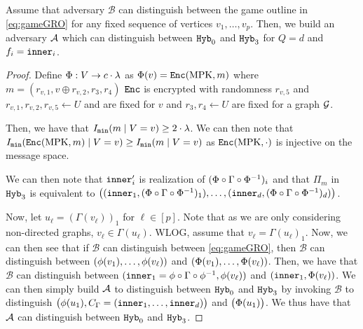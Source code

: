 \newcommand{\adversB}{\mathcal{B}}
\begin{lemma}
	Assume that adversary $\adversB$ can distinguish between the game outline in \cref{eq:gameGRO} for any fixed sequence of vertices $v_1, \dots, v_p$.
	Then, we build an adversary
	$\mathcal{A}$ which can distinguish between $\texttt{Hyb}_0$ and $\texttt{Hyb}_3$ for $Q = d$ and $f_i = \texttt{inner}_i$.
	\begin{proof}
		Define $\Phi : V \rightarrow c \cdot \lambda$ as $\Phi(v) = \texttt{Enc}(\text{MPK}, m)$ 
		where $m = (r_{v, 1}, v \oplus r_{v, 2}, r_3, r_4)$
		$\texttt{Enc}$ is encrypted with randomness $r_{v, 5}$ and $r_{v, 1}, r_{v, 2}, r_{v, 5} \leftarrow U$ and are fixed for $v$
		and $r_3, r_4 \leftarrow U$ are fixed for a graph $\mathcal{G}$.

		Then, we have that $I_\texttt{min}(m \mid V = v) \geq 2 \cdot \lambda$. We can then note that $I_\texttt{min}(\texttt{Enc}(\text{MPK}, m) \mid V = v) \geq I_\texttt{min}(m \mid V = v)$
		as $\texttt{Enc}(\text{MPK}, \cdot)$ is injective on the message space.
		
		We can then note that $\texttt{inner}_i'$ is realization
		of $(\Phi \circ \Gamma \circ \Phi^{-1})_i$ and that $\Pi_m$ in $\texttt{Hyb}_3$ 
		is equivalent to $\big((\texttt{inner}_1, (\Phi \circ \Gamma \circ \Phi^{-1})_1), \dots, (\texttt{inner}_d, (\Phi \circ \Gamma \circ \Phi^{-1})_d)\big)$.

		Now, let $u_\ell = (\Gamma(v_\ell))_1$ for $\ell \in [p]$. Note that as we are only considering non-directed graphs,
		$v_\ell \in \Gamma(u_\ell)$.
		WLOG, assume that $v_\ell = \Gamma(u_\ell)_1$.
		Now, we can then see that if $\adversB$ can distinguish between \cref{eq:gameGRO}, then $\adversB$ can distinguish between
		$(\phi(v_1), \dots, \phi(v_\ell))$ and $(\Phi(v_1), \dots, \Phi(v_\ell))$.
		Then, we have that $\adversB$ can distinguish between $(\texttt{inner}_1 = \phi \circ \Gamma \circ \phi^{-1}, \phi(v_\ell))$ and $(\texttt{inner}_1, \Phi(v_\ell))$.
		We can then simply build $\mathcal{A}$ to distinguish between $\texttt{Hyb}_0$ and $\texttt{Hyb}_3$ by invoking $\adversB$ to distinguish
		$\big(\phi(u_1), C_\Gamma = (\texttt{inner}_1, \dots, \texttt{inner}_d)\big)$ and $\big(\Phi(u_1)\big)$.
		We thus have that $\mathcal{A}$ can distinguish between $\texttt{Hyb}_0$ and $\texttt{Hyb}_3$.
	\end{proof}
\end{lemma}
